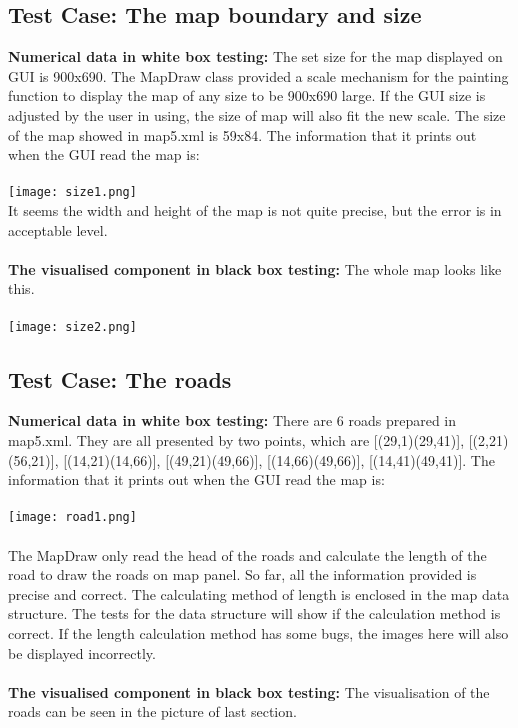 \documentclass[11pt, a4paper]{article}
\begin{document}
\subsection{Test Case: The map boundary and size}
\textbf{Numerical data in white box testing:} 
The set size for the map displayed on GUI is 900x690. The MapDraw class provided a scale mechanism for the painting function to display the map of any size to be 900x690 large. If the GUI size is adjusted by the user in using, the size of map will also fit the new scale. The size of the map showed in map5.xml is 59x84. The information that it prints out when the GUI read the map is: \\
\\
\texttt{[image: size1.png]}
\\
It seems the width and height of the map is not quite precise, but the error is in acceptable level. \\
\\
\textbf{The visualised component in black box testing:} 
The whole map looks like this.\\
\\
\texttt{[image: size2.png]}
\\
\newpage

\subsection{Test Case: The roads}
\textbf{Numerical data in white box testing:} 
There are 6 roads prepared in map5.xml. They are all presented by two points, which are [(29,1)(29,41)], [(2,21)(56,21)], [(14,21)(14,66)], [(49,21)(49,66)], [(14,66)(49,66)], [(14,41)(49,41)]. The information that it prints out when the GUI read the map is:\\
\\
\texttt{[image: road1.png]}\\
\\
The MapDraw only read the head of the roads and calculate the length of the road to draw the roads on map panel. So far, all the information provided is precise and correct. The calculating method of length is enclosed in the map data structure. The tests for the data structure will show if the calculation method is correct. If the length calculation method has some bugs, the images here will also be displayed incorrectly. \\
\\
\textbf{The visualised component in black box testing:} 
The visualisation of the roads can be seen in the picture of last section.\\
\\
\end{document}
